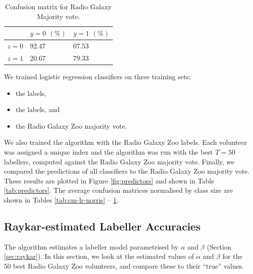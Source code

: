     \begin{table}
      \centering
      \begin{tabular}{l|ll}
          & $y = 0$  $(\%)$ & $y = 1$ $(\%)$ \\\hline
          $z = 0$ & $92.47$ & $07.53$ \\
          $z = 1$ & $20.67$ & $79.33$ \\
      \end{tabular}
      \caption{Confusion matrix for Radio Galaxy Majority vote.}
      \label{tab:cm-rgz-raw-mv}
    \end{table}

    We trained logistic regression classifiers on three training sets:
    \begin{itemize}
      \item the \citeauthor{norris06} labels,
      \item the \citeauthor{fan15} labels, and
      \item the Radio Galaxy Zoo majority vote.
    \end{itemize}
    We also trained the \citeauthor{raykar10} algorithm with the Radio Galaxy
    Zoo labels. Each volunteer was assigned a unique index and the algorithm was
    run with the best $T = 50$ labellers, computed against the Radio Galaxy Zoo
    majority vote. Finally, we compared the predictions of all classifiers to
    the Radio Galaxy Zoo majority vote. These results are plotted in Figure
    \ref{fig:predictors} and shown in Table \ref{tab:predictors}. The average
    confusion matrices normalised by class size are shown in Tables
    \ref{tab:cm-lr-norris} -- \ref{tab:cm-rgz-raw-mv}.


  \subsection{Raykar-estimated Labeller Accuracies}
  \label{sec:raykar-estimates-rgz}

    The \citeauthor{raykar10} algorithm estimates a labeller model parametrised
    by $\alpha$ and $\beta$ (Section \ref{sec:raykar}). In this section, we look
    at the estimated values of $\alpha$ and $\beta$ for the 50 best Radio Galaxy
    Zoo volunteers, and compare these to their ``true'' values.

